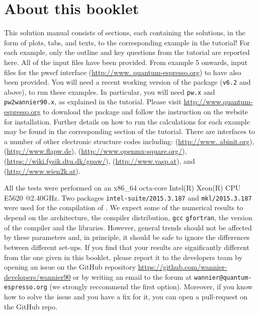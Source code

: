 \section*{About this booklet}
This solution manual consists of \numexamples{} sections, each containing the solutions, in the form of plots, tabs, and texts, to the corresponding example in the \Wannier{} \version{} tutorial! For each example, only the outline and key questions from the tutorial are reported here.
 All of the \Wannier{} input files have been provided. From example 5 onwards, input files for the pwscf interface (\url{http://www.
quantum-espresso.org}) to \Wannier{} have also been provided. You will need a recent working version of the \QE{} package (\texttt{v6.2} and above), to run these examples. In particular, you will need \texttt{pw.x} and \texttt{pw2wannier90.x}, as explained in the \Wannier{} \version{} tutorial.
Please visit \url{http://www.quantum-espresso.org} to download the package and follow the instruction on the website for installation. Further details on how to run the calculations for each example may be found in the corresponding section of the \Wannier{} \version{} tutorial.
There are interfaces to a number of other electronic structure codes including: \abinit{} (\url{http://www.
abinit.org}), \fleur{} (\url{http://www.flapw.de}), \OpenMX{} (\url{http://www.openmx-square.org/}), \GPAW{} (\url{https://wiki.fysik.dtu.dk/gpaw/}), \VASP{} (\url{http://www.vasp.at}), and \Wien{} (\url{http://www.wien2k.at}).

All the tests were performed on an x86\_64 octa-core Intel(R) Xeon(R) CPU E5620 @2.40GHz. Two packages \texttt{intel-suite/2015.3.187} and \texttt{mkl/2015.3.187} were used for the compilation of \Wannier{}. We expect some of the numerical results to depend on the architecture, the compiler distribution, \eg{} \texttt{gcc} \vs{} \texttt{gfortran}, the version of the compiler and the libraries. However, general trends should not be affected by these parameters and, in principle, it should be safe to ignore the differences between different set-ups. If you find that your results are significantly different from the one given in this booklet, please report it to the \Wannier{} developers team by opening an issue on the GitHub repository \url{https://github.com/wannier-developers/wannier90} or by writing an email to the forum at \texttt{wannier@quantum-espresso.org} (we strongly reccommend the first option). Moreover, if you know how to solve the issue and you have a fix for it, you can open a pull-request on the GitHub repo.